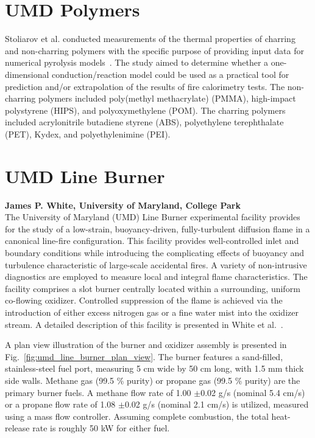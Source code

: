 \section{UMD Polymers}
\label{UMD_Polymers_Description}

Stoliarov et al. conducted measurements of the thermal properties of charring and non-charring polymers with the specific purpose of providing input data for numerical pyrolysis models~\cite{Li:IJHMT,Li:CF,Li:PDS_2014,Li:PDS_2015}. The study aimed to determine whether a one-dimensional conduction/reaction model could be used as a practical tool for prediction and/or extrapolation of the results of fire calorimetry tests. The non-charring polymers included poly(methyl methacrylate) (PMMA), high-impact polystyrene (HIPS), and polyoxymethylene (POM). The charring polymers included acrylonitrile butadiene styrene (ABS), polyethylene terephthalate (PET), Kydex, and polyethylenimine (PEI).


\section{UMD Line Burner}
\label{UMD_Line_Burner_Description}

{\bf James P. White, University of Maryland, College Park}\\

\noindent The University of Maryland (UMD) Line Burner experimental facility provides for the study of a low-strain, buoyancy-driven, fully-turbulent diffusion flame in a canonical line-fire configuration. This facility provides well-controlled inlet and boundary conditions while introducing the complicating effects of buoyancy and turbulence characteristic of large-scale accidental fires. A variety of non-intrusive diagnostics are employed to measure local and integral flame characteristics. The facility comprises a slot burner centrally located within a surrounding, uniform co-flowing oxidizer. Controlled suppression of the flame is achieved via the introduction of either excess nitrogen gas or a fine water mist into the oxidizer stream. A detailed description of this facility is presented in White et al.~\cite{White:2015}.

A plan view illustration of the burner and oxidizer assembly is presented in Fig.~\ref{fig:umd_line_burner_plan_view}.  The burner features a sand-filled, stainless-steel fuel port, measuring 5 cm wide by 50 cm long, with 1.5 mm thick side walls. Methane gas (99.5 \% purity) or propane gas (99.5 \% purity) are the primary burner fuels. A methane flow rate of 1.00 $\pm$0.02 g/s (nominal 5.4 cm/s) or a propane flow rate of 1.08 $\pm$0.02 g/s (nominal 2.1 cm/s) is utilized, measured using a mass flow controller. Assuming complete combustion, the total heat-release rate is roughly 50 kW for either fuel.

